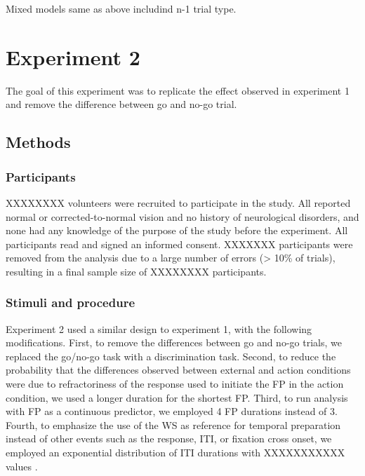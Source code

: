 \documentclass{article}
\begin{document}
Mixed models
same as above
includind n-1 trial type.

\section{Experiment 2}

The goal of this experiment was to replicate the effect observed in experiment 1 and remove the difference between go and no-go trial.

\subsection{Methods}

\subsubsection{Participants}
XXXXXXXX volunteers were recruited to participate in the study. All reported normal or corrected-to-normal vision and no history of neurological disorders, and none had any knowledge of the purpose of the study before the experiment. All participants read and signed an informed consent. XXXXXXX participants were removed from the analysis due to a large number of errors (> 10\% of trials), resulting in a final sample size of XXXXXXXX participants.

\subsubsection{Stimuli and procedure}
Experiment 2 used a similar design to experiment 1, with the following modifications. First, to remove the differences between go and no-go trials, we replaced the go/no-go task with a discrimination task. Second, to reduce the probability that the differences observed between external and action conditions were due to refractoriness of the response used to initiate the FP in the action condition, we used a longer duration for the shortest FP. Third, to run analysis with FP as a continuous predictor, we employed 4 FP durations instead of 3. Fourth, to emphasize the use of the WS as reference for temporal preparation instead of other events such as the response, ITI, or fixation cross onset, we employed an exponential distribution of ITI durations with XXXXXXXXXXX values \cite{jepma_temporal_2012}. %
\end{document}
